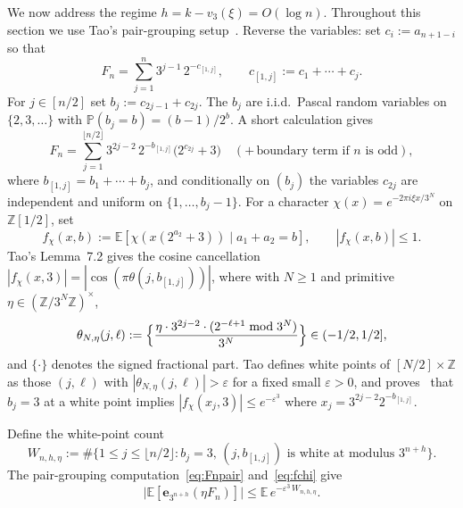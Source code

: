 \documentclass[11pt,a4paper]{amsart}
\theoremstyle{plain}
\theoremstyle{definition}
\newcommand{\Z}{\mathbb{Z}}
\newcommand{\E}{\mathbb{E}}
\newcommand{\PP}{\mathbb{P}}
\begin{document}
We now address the regime $h=k-v_3(\xi)=O(\log n)$.
Throughout this section we use Tao's pair-grouping setup~\cite[\S7]{Tao}.
Reverse the variables: set $c_i:=a_{n+1-i}$ so that
\begin{equation}\label{eq:Fnreverse}
F_n=\sum_{j=1}^n3^{j-1}\,2^{-c_{[1,j]}},\qquad c_{[1,j]}:=c_1+\cdots+c_j.
\end{equation}
For $j\in[n/2]$ set $b_j:=c_{2j-1}+c_{2j}$.
The $b_j$ are i.i.d.\ Pascal random variables on $\{2,3,\dots\}$ with
$\PP(b_j=b)=(b-1)/2^b$.
A short calculation gives
\begin{equation}\label{eq:Fnpair}
F_n=\sum_{j=1}^{\lfloor n/2\rfloor}3^{2j-2}\,2^{-b_{[1,j]}}\bigl(2^{c_{2j}}+3\bigr)
\quad(+\,\text{boundary term if }n\text{ is odd}),
\end{equation}
where $b_{[1,j]}=b_1+\cdots+b_j$, and conditionally on $(b_j)$ the variables
$c_{2j}$ are independent and uniform on $\{1,\dots,b_j-1\}$.
For a character $\chi(x)=e^{-2\pi i\xi x/3^N}$ on $\Z[1/2]$, set
\begin{equation}\label{eq:fchi}
f_\chi(x,b):=\E[\chi(x(2^{a_2}+3))\mid a_1+a_2=b],\qquad |f_\chi(x,b)|\le1.
\end{equation}
Tao's Lemma~7.2 \cite{Tao} gives the cosine cancellation
$|f_\chi(x,3)|=|\cos(\pi\theta(j,b_{[1,j]}))|$, where with $N\ge1$ and
primitive $\eta\in(\Z/3^N\Z)^\times$,
\begin{equation}\label{eq:thetadef}
\theta_{N,\eta}(j,\ell):=\Bigl\{\frac{\eta\cdot 3^{2j-2}\cdot
(2^{-\ell+1}\bmod 3^N)}{3^N}\Bigr\}\in(-1/2,1/2],
\end{equation}
and $\{\cdot\}$ denotes the signed fractional part.
Tao defines white points of $[N/2]\times\Z$ as those $(j,\ell)$ with
$|\theta_{N,\eta}(j,\ell)|>\varepsilon$ for a fixed small $\varepsilon>0$,
and proves~\cite[Lemma~7.2]{Tao} that $b_j=3$ at a white point implies
$|f_\chi(x_j,3)|\le e^{-\varepsilon^3}$ where $x_j=3^{2j-2}2^{-b_{[1,j]}}$.

Define the white-point count
\begin{equation}\label{eq:Wcount}
W_{n,h,\eta}:=
\#\bigl\{1\le j\le \lfloor n/2\rfloor:b_j=3,\,(j,b_{[1,j]})\text{ is white at modulus }3^{n+h}\bigr\}.
\end{equation}
The pair-grouping computation~\eqref{eq:Fnpair} and~\eqref{eq:fchi} give
\begin{equation}\label{eq:WtoFn}
\bigl|\E[\mathbf e_{3^{n+h}}(\eta F_n)]\bigr|\le\E\,e^{-\varepsilon^3\,W_{n,h,\eta}}.
\end{equation}
\end{document}
